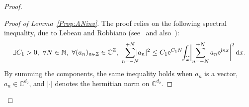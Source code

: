 \documentclass[10pt]{amsart}
\theoremstyle{plain}
\theoremstyle{definition}
\theoremstyle{remark}
\newcommand{\diff}[1][-3]{\ensuremath{\mathop{}\mkern#1mu\mathrm{d}}}
\newcommand{\set}{\mathbb}
\newcommand{\N}{\set{N}}
\newcommand{\Z}{\set{Z}}
\renewcommand{\C}{\set{C}}
\newcommand{\eu}{\mathrm e}
\newcommand{\iu}{\mathrm i}
\begin{document}
\begin{proof}
\begin{proof}[Proof of Lemma~\ref{Prop:ANinv}]
The proof relies on the following spectral inequality, due to Lebeau and Robbiano (see~\cite{lebeau_1995} and also~\cite[Th.\,5.4]{lerousseau_2012}):
\begin{equation}\label{eq:spectral}
\exists C_1>0,\ \forall N \in \N,\ \forall (a_n)_{n\in\Z} \in \C^\Z, \
\sum_{n=-N}^{+N}\hspace*{-2mm} |a_n|^2 \leq C_1 \eu^{C_1 N} \hspace*{-1mm}\int_{\widehat{\omega}} \biggl|\sum_{n=-N}^{+N} a_n \eu^{\iu nx}\biggr|^2 \diff x.
\end{equation}
By summing the components, the same inequality holds when $a_n$ is a vector, $a_n \in \C^{d_2}$, and $|\cdot|$ denotes the hermitian norm on $\C^{d_2}$.


\end{proof}
\end{proof}
\end{document}
